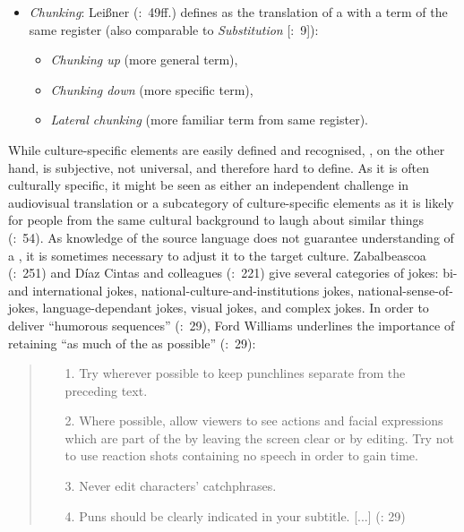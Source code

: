 \begin{itemize}
\item \textit{Chunking}: Leißner (\citeyear{Leisner2009}:~49ff.) defines  as the translation of a  with a term of the same register (also comparable to \textit{Substitution} [\citealt{pedersen2005}:~9]):
\begin{itemize}
\item \textit{Chunking up} (more general term),
\item \textit{Chunking down} (more specific term),
\item \textit{Lateral chunking} (more familiar term from same register).
\end{itemize}
\end{itemize}

\fussy
While culture-specific elements are easily defined and recognised, , on the other hand, is subjective, not universal, and therefore hard to define. As it is often culturally specific, it might be seen as either an independent challenge in audiovisual translation or a subcategory of culture-specific elements as it is likely for people from the same cultural background to laugh about similar things (\citealt{Leisner2009}:~54). As knowledge of the source language does not guarantee understanding of a , it is sometimes necessary to adjust it to the target culture. Zabalbeascoa (\citeyear{Zabalbeascoa1996}:~251) and Díaz Cintas and colleagues (\citeyear{Diaz_cintas2007b}:~221) give several categories of jokes: bi- and international jokes, national-culture-and-institutions jokes, national-sense-of- jokes, language-dependant jokes, visual jokes, and complex jokes. In order to deliver “humorous sequences” (\citeyear{Ford_williams2009}:~29), Ford Williams underlines the importance of retaining “as much of the  as possible” (\citeyear{Ford_williams2009}:~29):
\begin{quote}
\begin{itemize}
\item[1.] Try wherever possible to keep punchlines separate from the preceding text.
\item[2.] Where possible, allow viewers to see actions and facial expressions which are part of the  by leaving the screen clear or by editing. Try not to use reaction shots containing no speech in order to gain time.
\item[3.] Never edit characters' catchphrases.
\item[4.] Puns should be clearly indicated in your subtitle. [...] (\citealt{Ford_williams2009}: 29)
\end{itemize}
\end{quote}

